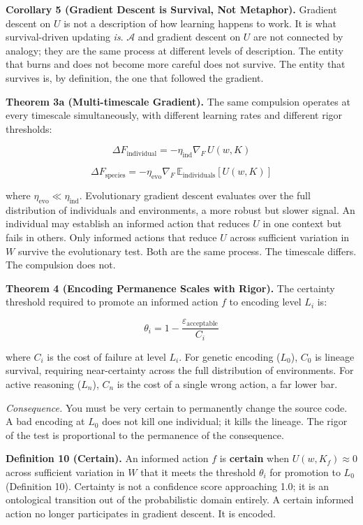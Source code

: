 \documentclass[
]{article}
\begin{document}
\textbf{Corollary 5 (Gradient Descent is Survival, Not Metaphor).}
Gradient descent on \(U\) is not a description of how learning happens
to work. It is what survival-driven updating \emph{is}. \(\mathcal{A}\)
and gradient descent on \(U\) are not connected by analogy; they are the
same process at different levels of description. The entity that burns
and does not become more careful does not survive. The entity that
survives is, by definition, the one that followed the gradient.

\textbf{Theorem 3a (Multi-timescale Gradient).} The same compulsion
operates at every timescale simultaneously, with different learning
rates and different rigor thresholds:

\[\Delta F_{\text{individual}} = -\eta_{\text{ind}} \nabla_F \, U(w, K)\]

\[\Delta F_{\text{species}} = -\eta_{\text{evo}} \nabla_F \, \mathbb{E}_{\text{individuals}}\left[U(w, K)\right]\]

where \(\eta_{\text{evo}} \ll \eta_{\text{ind}}\). Evolutionary gradient
descent evaluates over the full distribution of individuals and
environments, a more robust but slower signal. An individual may
establish an informed action that reduces \(U\) in one context but fails
in others. Only informed actions that reduce \(U\) across sufficient
variation in \(W\) survive the evolutionary test. Both are the same
process. The timescale differs. The compulsion does not.

\textbf{Theorem 4 (Encoding Permanence Scales with Rigor).} The
certainty threshold required to promote an informed action \(f\) to
encoding level \(L_i\) is:

\[\theta_i = 1 - \frac{\varepsilon_{\text{acceptable}}}{C_i}\]

where \(C_i\) is the cost of failure at level \(L_i\). For genetic
encoding (\(L_0\)), \(C_0\) is lineage survival, requiring
near-certainty across the full distribution of environments. For active
reasoning (\(L_n\)), \(C_n\) is the cost of a single wrong action, a far
lower bar.

\emph{Consequence.} You must be very certain to permanently change the
source code. A bad encoding at \(L_0\) does not kill one individual; it
kills the lineage. The rigor of the test is proportional to the
permanence of the consequence.

\textbf{Definition 10 (Certain).} An informed action \(f\) is
\textbf{certain} when \(U(w, K_f) \approx 0\) across sufficient
variation in \(W\) that it meets the threshold \(\theta_i\) for
promotion to \(L_0\) (Definition 10). Certainty is not a confidence
score approaching 1.0; it is an ontological transition out of the
probabilistic domain entirely. A certain informed action no longer
participates in gradient descent. It is encoded.
\end{document}
